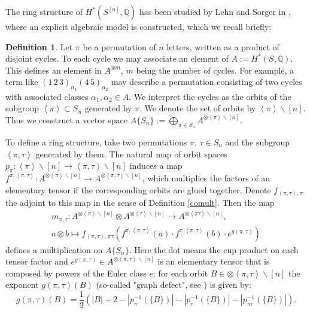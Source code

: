 \documentclass{amsart}
\newcommand{\hilb}[1]{^{[#1]}}
\newcommand{\IQ}{\mathbb{Q}}
\theoremstyle{plain}
\theoremstyle{definition}
\newtheorem{definition}[theorem]{Definition}
\theoremstyle{remark}
\begin{document}
The ring structure of $H^\ast(S\hilb{n}, \IQ)$ has been studied by Lehn and Sorger in \cite{LehnSorger}, where an explicit algebraic model is constructed, which we recall briefly:
\begin{definition} \label{model}\cite[Sect. 2]{LehnSorger}
Let $\pi$ be a permutation of $n$ letters, written as a product of disjoint cycles. To each cycle we may associate an element of $A:=H^\ast(S,\IQ)$. This defines an element in $A^{\otimes m}$, $m$ being the number of cycles. For example, a term like $(1\,2\,3)_{\alpha_1}(4\,5)_{\alpha_2}$ may describe a permutation consisting of two cycles with associated classes $\alpha_1,\alpha_2\in A$. We interpret the cycles as the orbits of the subgroup $\left<\pi\right>\subset S_n$ generated by $\pi$. We denote the set of orbits by $\left<\pi\right>\backslash[n]$. Thus we construct a vector space $A\{S_n\}:=\bigoplus_{\pi\in S_n} A^{\otimes\left<\pi\right>\backslash[n]}$. 

To define a ring structure, take two permutations $\pi,\,\tau \in S_n$ and the subgroup $\left< \pi,\tau\right>$ generated by them. The natural map of orbit spaces
$
p_\pi:\left<\pi\right>\backslash[n] \rightarrow \left<\pi,\tau\right>\backslash[n]
$
induces a map $f^{\pi,\left<\pi,\tau\right>} : A^{\otimes\left<\pi\right>\backslash[n]} \rightarrow A^{\otimes\left<\pi,\tau\right>\backslash[n]}$, which multiplies the factors of an elementary tensor if the corresponding orbits are glued together.
Denote $f_{\left<\pi,\tau\right>,\pi} $ the adjoint to this map in the sense of Definition \ref{comult}. Then the map
\begin{gather*}
m_{\pi,\tau} : A^{\otimes\left<\pi\right>\backslash[n]} \otimes A^{\otimes\left<\tau\right>\backslash[n]} \longrightarrow A^{\otimes\left<\pi\tau\right>\backslash[n]} ,  \\
a\otimes b \longmapsto  f_{\left<\pi,\tau\right>,\pi\tau} (f^{\pi,\left<\pi,\tau\right>} (a)\cdot f^{\tau,\left<\pi,\tau\right>}(b)\cdot  e^{g(\pi,\tau)} ) 
\end{gather*}
defines a multiplication on $A\{S_n\}$. Here the dot means the cup product on each tensor factor and $e^{g(\pi,\tau)} \in A^{\otimes\left<\pi,\tau\right>\backslash[n]}$ is an elementary tensor that is composed by powers of the Euler class $e$: for each orbit $B \in  {\otimes\left<\pi,\tau\right>\backslash[n]}$ the exponent $g(\pi,\tau)(B)$ (so-called "graph defect", see \cite[2.6]{LehnSorger}) is given by:
$$
g(\pi,\tau)(B) = \frac{1}{2}\left( |B| +2 - |p_\pi^{-1}(\{B\})|- |p_\tau^{-1}(\{B\})| - |p_{\pi\tau}^{-1}(\{B\})|  \right).
$$

\end{definition}
\end{document}
